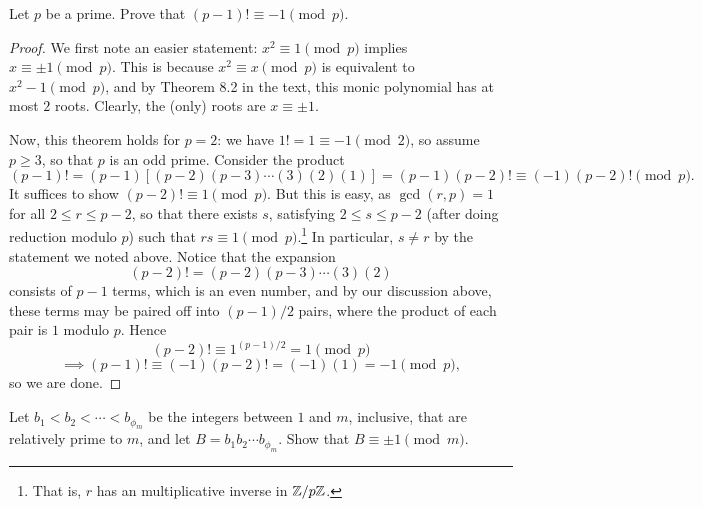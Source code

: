\documentclass{article}
\begin{document}
\begin{exercise}
Let $p$ be a prime. Prove that $(p-1)! \equiv -1\pmod p$.
\end{exercise}
\begin{proof}
We first note an easier statement: $x^2\equiv 1\pmod p$ implies $x\equiv \pm 1\pmod p$. This is because $x^2\equiv x\pmod p$ is equivalent to $x^2 - 1 \pmod p$, and by Theorem 8.2 in the text, this monic polynomial has at most $2$ roots. Clearly, the (only) roots are $x\equiv \pm 1$.

Now, this theorem holds for $p=2$: we have $1! = 1\equiv -1\pmod 2$, so assume $p\geq 3$, so that $p$ is an odd prime. Consider the product
$$(p-1)! = (p-1)[(p-2)(p-3)\cdots (3)(2)(1)] = (p-1)(p-2)! \equiv (-1)(p-2)! \pmod p.$$
It suffices to show $(p-2)!\equiv 1\pmod p$. But this is easy, as $\gcd(r, p) = 1$ for all $2\leq r \leq p-2$, so that there exists $s$, satisfying $2\leq s\leq p-2$ (after doing reduction modulo $p$) such that $rs\equiv 1\pmod p$.\footnote{That is, $r$ has an multiplicative inverse in $\mathbb Z/p\mathbb Z$.} In particular, $s\neq r$ by the statement we noted above. Notice that the expansion
$$(p-2)! = (p-2)(p-3)\cdots (3)(2)$$
consists of $p-1$ terms, which is an even number, and by our discussion above, these terms may be paired off into $(p-1)/2$ pairs, where the product of each pair is $1$ modulo $p$. Hence
$$(p-2)! \equiv 1^{(p-1)/2}= 1 \pmod p$$
$$\implies (p-1)! \equiv (-1)(p-2)! = (-1)(1) = -1\pmod p,$$
so we are done.
\end{proof}

\begin{exercise}[Chapter 10, \#1a]
Let $b_1 < b_2 < \cdots < b_{\phi_m}$ be the integers between $1$ and $m$, inclusive, that are relatively prime to $m$, and let $B = b_1b_2\cdots b_{\phi_m}$. Show that $B \equiv \pm 1\pmod m$.
\end{exercise}
\end{document}
